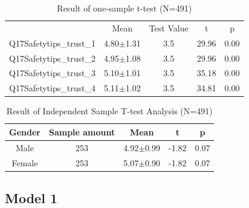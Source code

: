 \begin{table}[h]
  \caption[Result of one-sample t-test]{Result of one-sample t-test (N=491)}
  \label{table29}
  \centering
  \begin{tabular}{l|cccc}
 \hline
                  & Mean                 & Test Value & t                          & p                        \\
Q17Safetytips\_trust\_1 & 4.80$\pm$1.31            & 3.5                            & 29.96 & 0.00 \\
Q17Safetytips\_trust\_2 & 4.95$\pm$1.08            & 3.5                            & 29.96 & 0.00 \\
Q17Safetytips\_trust\_3 & 5.10$\pm$1.01            & 3.5                            & 35.18 & 0.00 \\
Q17Safetytips\_trust\_4 & 5.11$\pm$1.02            & 3.5                            & 34.81 & 0.00 \\
 \hline
  \end{tabular}
\end{table}

\begin{table}[h]
  \caption[Result of Independent Sample T-test Analysis]{Result of Independent Sample T-test Analysis (N=491)}
  \label{table30}
  \centering
  \begin{tabular}{c|cccc}
 \hline
        Gender          & Sample amount                 & Mean & t                          & p                        \\
\hline
Male & 253            & 4.92$\pm$0.99                  & -1.82 & 0.07 \\
Female & 253            & 5.07$\pm$0.90              & -1.82 & 0.07 \\

 \hline
  \end{tabular}
\end{table}

\subsection{Model 1}

